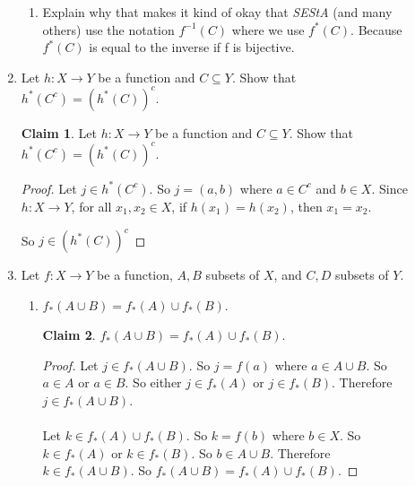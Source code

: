 \documentclass[11pt]{letter}
\theoremstyle{definition}
\newtheorem{claim}{Claim}
\begin{document}
\begin{description}
\begin{enumerate}
\begin{enumerate}
                                  
					\item Explain why that makes it kind of okay that {\em SEStA} (and many others) use the notation $f^{-1}(C)$ where we use $f^*(C)$. Because $f^*(C)$ is equal to the inverse if f is bijective. 
				\end{enumerate}
	
			      \item Let $h:X\rightarrow Y$ be a function and $C\subseteq Y$. Show that $h^*(C^c)=\left(h^*(C)\right)^c$.
                                \begin{claim}
                                  Let $h:X\rightarrow Y$ be a function and $C\subseteq Y$. Show that $h^*(C^c)=\left(h^*(C)\right)^c$.
                                \end{claim}
                                \begin{proof}
                                  Let $j\in h^*(C^c)$. So $j=(a,b)$ where $a\in C^c$ and $b\in X$. Since $h:X\rightarrow Y$, for all $x_1,x_2\in X$, if $h(x_1)=h(x_2)$, then $x_1=x_2$.

                                  So $j\in (h^*(C))^c$
                                \end{proof}
                                
                                
			\item Let $f:X\rightarrow Y$ be a function, $A,B$ subsets of $X$, and $C,D$ subsets of $Y$.
				\begin{enumerate}
				\item  $f_*(A\cup B)=f_*(A)\cup f_*(B)$.
                                  \begin{claim}
                                    $f_*(A\cup B)=f_*(A)\cup f_*(B)$.
                                  \end{claim}
                                  \begin{proof}
                                    Let $j\in f_*(A\cup B)$. So $j=f(a)$ where $a\in A\cup B$. So $a\in A$ or $a\in B$. So either $j\in f_*(A)$ or $j\in f_*(B)$. Therefore $j\in f_*(A\cup B)$.\\ \\
                                    Let $k\in f_*(A)\cup f_*(B)$. So $k=f(b)$ where $b\in X$. So $k\in f_*(A)$ or $k\in f_*(B)$. So $b\in A\cup B$. Therefore $k\in f_*(A\cup B)$. So $f_*(A\cup B)=f_*(A)\cup f_*(B)$.
                                  \end{proof}
                                  

\end{enumerate}
\end{enumerate}
\end{description}
\end{document}
